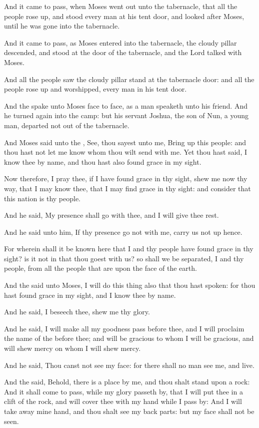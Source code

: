 \Verse And it came to pass, when Moses went out unto the tabernacle, that all the people rose up, and stood every man at his tent door, and looked after Moses, until he was gone into the tabernacle.

\Verse And it came to pass, as Moses entered into the tabernacle, the cloudy pillar descended, and stood at the door of the tabernacle, and the Lord talked with Moses.

\Verse And all the people saw the cloudy pillar stand at the tabernacle door: and all the people rose up and worshipped, every man in his tent door.

\Verse And the \LORD spake unto Moses face to face, as a man speaketh unto his friend. And he turned again into the camp: but his servant Joshua, the son of Nun, a young man, departed not out of the tabernacle.

\Verse And Moses said unto the \LORD, See, thou sayest unto me, Bring up this people: and thou hast not let me know whom thou wilt send with me. Yet thou hast said, I know thee by name, and thou hast also found grace in my sight.

\Verse Now therefore, I pray thee, if I have found grace in thy sight, shew me now thy way, that I may know thee, that I may find grace in thy sight: and consider that this nation is thy people.

\Verse And he said, My presence shall go with thee, and I will give thee rest.

\Verse And he said unto him, If thy presence go not with me, carry us not up hence.

\Verse For wherein shall it be known here that I and thy people have found grace in thy sight? is it not in that thou goest with us? so shall we be separated, I and thy people, from all the people that are upon the face of the earth.

\Verse And the \LORD said unto Moses, I will do this thing also that thou hast spoken: for thou hast found grace in my sight, and I know thee by name.

\Verse And he said, I beseech thee, shew me thy glory.

\Verse And he said, I will make all my goodness pass before thee, and I will proclaim the name of the \LORD before thee; and will be gracious to whom I will be gracious, and will shew mercy on whom I will shew mercy.

\Verse And he said, Thou canst not see my face: for there shall no man see me, and live.

\Verse And the \LORD said, Behold, there is a place by me, and thou shalt stand upon a rock: \Verse And it shall come to pass, while my glory passeth by, that I will put thee in a clift of the rock, and will cover thee with my hand while I pass by: \Verse And I will take away mine hand, and thou shalt see my back parts: but my face shall not be seen.

